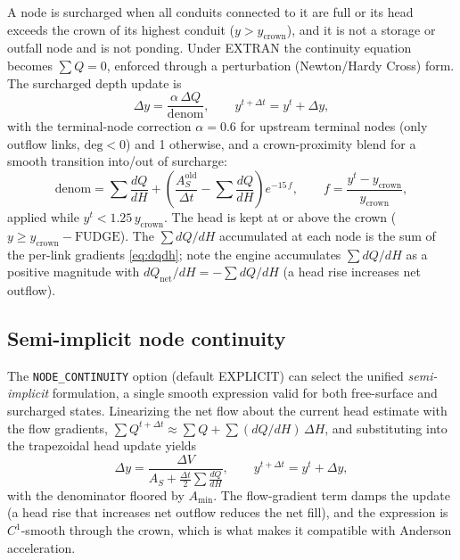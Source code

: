 \documentclass[11pt,a4paper]{article}
\begin{document}
A node is surcharged when all conduits connected to it are full or its head
exceeds the crown of its highest conduit ($y > y_{\mathrm{crown}}$), and it is
not a storage or outfall node and is not ponding. Under EXTRAN the continuity
equation becomes $\sum Q = 0$, enforced through a perturbation (Newton/Hardy
Cross) form. The surcharged depth update is
\begin{equation}
  \Delta y = \frac{\alpha\,\Delta Q}{\mathrm{denom}}, \qquad
  y^{t+\Delta t} = y^{t} + \Delta y,
\end{equation}
with the terminal-node correction $\alpha = 0.6$ for upstream terminal nodes
(only outflow links, $\mathrm{deg} < 0$) and 1 otherwise, and a crown-proximity
blend for a smooth transition into/out of surcharge:
\begin{equation}
  \mathrm{denom} = \sum \frac{dQ}{dH} +
  \left(\frac{A_S^{\mathrm{old}}}{\Delta t} - \sum \frac{dQ}{dH}\right)
  e^{-15\,f},
  \qquad f = \frac{y^{t} - y_{\mathrm{crown}}}{y_{\mathrm{crown}}},
\end{equation}
applied while $y^{t} < 1.25\,y_{\mathrm{crown}}$. The head is kept at or above
the crown ($y \ge y_{\mathrm{crown}} - \mathrm{FUDGE}$). The $\sum dQ/dH$
accumulated at each node is the sum of the per-link gradients
\eqref{eq:dqdh}; note the engine accumulates $\sum dQ/dH$ as a positive
magnitude with $dQ_{\mathrm{net}}/dH = -\sum dQ/dH$ (a head rise increases net
outflow).

\subsection{Semi-implicit node continuity}

The \texttt{NODE\_CONTINUITY} option (default EXPLICIT) can select the unified
\emph{semi-implicit} formulation, a single smooth expression valid for both
free-surface and surcharged states. Linearizing the net flow about the current
head estimate with the flow gradients, $\sum Q^{t+\Delta t} \approx \sum Q +
\sum(dQ/dH)\,\Delta H$, and substituting into the trapezoidal head update
yields
\begin{equation}
  \Delta y = \frac{\Delta V}
    {A_S + \tfrac{\Delta t}{2}\sum \frac{dQ}{dH}}, \qquad
  y^{t+\Delta t} = y^{t} + \Delta y,
\end{equation}
with the denominator floored by $A_{\min}$. The flow-gradient term damps the
update (a head rise that increases net outflow reduces the net fill), and the
expression is $C^1$-smooth through the crown, which is what makes it compatible
with Anderson acceleration.
\end{document}

